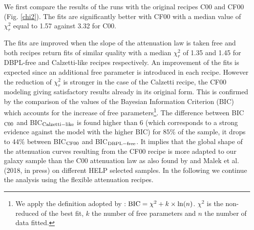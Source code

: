 \documentclass{aa}
\begin{document}
We first compare the results of the runs with the original recipes  C00 and CF00  (Fig. \ref{chi2}). The fits are significantly  better with CF00 with a median value of $\chi_r^2$ equal to 1.57 against 3.32 for C00.

The fits are  improved when the slope of the attenuation law is taken free and both recipes  return fits of similar quality with a  median  $\chi_r^2$ of 1.35 and 1.45 
 for DBPL-free and Calzetti-like recipes respectively. An improvement of the fits is expected since an additional free parameter is introduced in each recipe. However  the reduction of  $\chi_r^2$ is stronger  in the case of the Calzetti recipe, the CF00 modeling giving satisfactory results already in its original form. 
 {This is confirmed by the comparison of the values of the Bayesian Information Criterion (BIC) which accounts for the increase of free parameters\footnote{We apply the definition adopted by  \citet{Ciesla18}: ${\rm BIC}= \chi^2+k \times \ln(n)$. $\chi^2$ is the non-reduced of the best fit, $k$ the number of free parameters and $n$ the number of data fitted.}. The difference between  BIC$_{\rm C00}$ and BIC$_{\rm Calzetti-like}$ is found higher than 6 (which corresponds to a strong evidence against the model with the higher BIC) for $85\%$ of the sample, it drops to 44\% between  BIC$_{\rm CF00}$ and BIC$_{\rm DBPL-free}$.}
 It {implies } that the global shape of the attenuation curves resulting from the CF00 recipe is  more adapted to our galaxy sample  than the C00 attenuation law as also found by \citet{LoFaro17} and Malek et al. (2018, in press) on different HELP selected samples.
In the following we continue the analysis using  the flexible attenuation recipes.
\end{document}
